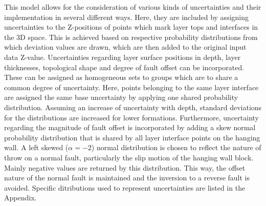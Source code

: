 		This model allows for the consideration of various kinds of uncertainties and their implementation in several different ways. Here, they are included by assigning uncertainties to the Z-positions of points which mark layer tops and interfaces in the 3D space. This is achieved based on respective probability distributions from which deviation values are drawn, which are then added to the original input data Z-value. Uncertainties regarding layer surface positions in depth, layer thicknesses, topological shape and degree of fault offset can be incorporated. These can be assigned as homogeneous sets to groups which are to share a common degree of uncertainty. Here, points belonging to the same layer interface are assigned the same base uncertainty by applying one shared probability distribution. Assuming an increase of uncertainty with depth, standard deviations for the distributions are increased for lower formations. Furthermore, uncertainty regarding the magnitude of fault offset is incorporated by adding a skew normal probability distribution that is shared by all layer interface points on the hanging wall. A left skewed ($\alpha=-2$) normal distribution is chosen to reflect the nature of throw on a normal fault, particularly the slip motion of the hanging wall block. Mainly negative values are returned by this distribution. This way, the offset nature of the normal fault is maintained and the inversion to a reverse fault is avoided. Specific ditributions used to represent uncertainties are listed in the Appendix.
